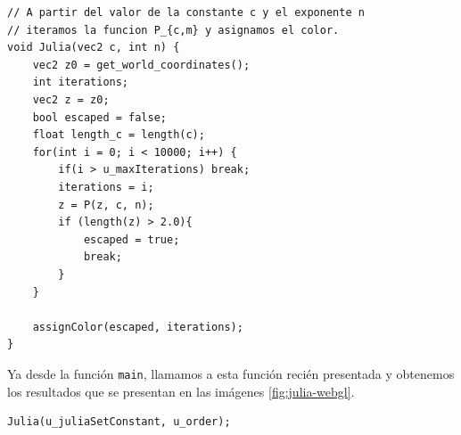 \begin{lstlisting}
// A partir del valor de la constante c y el exponente n
// iteramos la funcion P_{c,m} y asignamos el color.
void Julia(vec2 c, int n) {
    vec2 z0 = get_world_coordinates();
    int iterations;
    vec2 z = z0;
    bool escaped = false;
    float length_c = length(c);
    for(int i = 0; i < 10000; i++) {
        if(i > u_maxIterations) break;
        iterations = i;
        z = P(z, c, n);
        if (length(z) > 2.0){
            escaped = true;
            break;
        }
    }

    assignColor(escaped, iterations);
}
\end{lstlisting}

Ya desde la función \verb|main|, llamamos a esta función recién presentada y obtenemos los resultados que se presentan en las imágenes \ref{fig:julia-webgl}.  

\begin{lstlisting}
Julia(u_juliaSetConstant, u_order);
\end{lstlisting}


